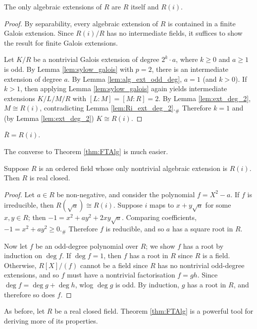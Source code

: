 \begin{theorem}
  \label{thm:FTAlg}
  The only algebraic extensions of $R$ are $R$ itself and $R(i)$.
\end{theorem}
\begin{proof}
  By separability, every algebraic extension of $R$ is contained in a finite Galois extension. Since $R(i)/R$ has no intermediate fields, it suffices to show the result for finite Galois extensions.
  
  Let $K/R$ be a nontrivial Galois extension of degree $2^k\cdot a$, where $k\geq 0$ and $a\geq1$ is odd. By Lemma \ref{lem:sylow_galois} with $p=2$, there is an intermediate extension of degree $a$. By Lemma \ref{lem:alg_ext_odd_deg}, $a=1$ (and $k>0$). If $k>1$, then applying Lemma \ref{lem:sylow_galois} again yields intermediate extensions $K/L/M/R$ with $[L:M]=[M:R]=2$. By Lemma \ref{lem:ext_deg_2}, $M\cong R(i)$, contradicting Lemma \ref{lem:Ri_ext_deg_2}.$_\#$ Therefore $k=1$ and (by Lemma \ref{lem:ext_deg_2}) $K\cong R(i)$.
\end{proof}

\begin{corollary}
  $\bar{R}=R(i)$.
\end{corollary}

The converse to Theorem \ref{thm:FTAlg} is much easier.

\begin{lemma}
  \label{lem:FTAlg_converse}
  Suppose $R$ is an ordered field whose only nontrivial algebraic extension is $R(i)$. Then $R$ is real closed.
\end{lemma}
\begin{proof}
  Let $a\in R$ be non-negative, and consider the polynomial $f=X^2-a$. If $f$ is irreducible, then $R(\sqrt{a})\cong R(i)$. Suppose $i$ maps to $x+y\sqrt{a}$ for some $x,y\in R$; then $-1=x^2+ay^2+2xy\sqrt{a}$. Comparing coefficients, $-1=x^2+ay^2\geq0$.$_\#$ Therefore $f$ is reducible, and so $a$ has a square root in $R$.

  Now let $f$ be an odd-degree polynomial over $R$; we show $f$ has a root by induction on $\deg f$. If $\deg f=1$, then $f$ has a root in $R$ since $R$ is a field. Otherwise, $R[X]/(f)$ cannot be a field since $R$ has no nontrivial odd-degree extensions, and so $f$ must have a nontrivial factorisation $f=gh$. Since $\deg f=\deg g+\deg h$, wlog $\deg g$ is odd. By induction, $g$ has a root in $R$, and therefore so does $f$.
\end{proof}

As before, let $R$ be a real closed field. Theorem \ref{thm:FTAlg} is a powerful tool for deriving more of its properties.

